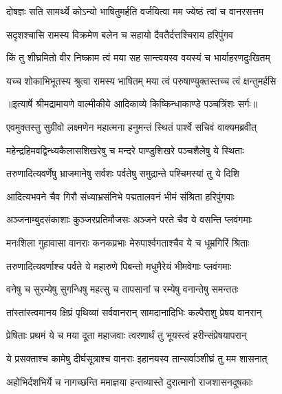 \twolineshloka
{दोषज्ञः सति सामर्थ्ये कोऽन्यो भाषितुमर्हति}
{वर्जयित्वा मम ज्येष्ठं त्वां च वानरसत्तम} %

\twolineshloka
{सदृशश्चासि रामस्य विक्रमेण बलेन च}
{सहायो दैवतैर्दत्तश्चिराय हरिपुंगव} %

\twolineshloka
{किं तु शीघ्रमितो वीर निष्क्राम त्वं मया सह}
{सान्त्वयस्व वयस्यं च भार्याहरणदुःखितम्} %

\twolineshloka
{यच्च शोकाभिभूतस्य श्रुत्वा रामस्य भाषितम्}
{मया त्वं परुषाण्युक्तस्तच्च त्वं क्षन्तुमर्हसि} %


{॥इत्यार्षे श्रीमद्रामायणे वाल्मीकीये आदिकाव्ये किष्किन्धाकाण्डे पञ्चत्रिंशः सर्गः॥}


\twolineshloka
{एवमुक्तस्तु सुग्रीवो लक्ष्मणेन महात्मना}
{हनुमन्तं स्थितं पार्श्वे सचिवं वाक्यमब्रवीत्} %

\twolineshloka
{महेन्द्रहिमवद्विन्ध्यकैलासशिखरेषु च}
{मन्दरे पाण्डुशिखरे पञ्चशैलेषु ये स्थिताः} %

\twolineshloka
{तरुणादित्यवर्णेषु भ्राजमानेषु सर्वशः}
{पर्वतेषु समुद्रान्ते पश्चिमस्यां तु ये दिशि} %

\twolineshloka
{आदित्यभवने चैव गिरौ संध्याभ्रसंनिभे}
{पद्मतालवनं भीमं संश्रिता हरिपुंगवाः} %

\twolineshloka
{अञ्जनाम्बुदसंकाशाः कुञ्जरप्रतिमौजसः}
{अञ्जने परते चैव ये वसन्ति प्लवंगमाः} %

\twolineshloka
{मनःशिला गुहावासा वानराः कनकप्रभाः}
{मेरुपार्श्वगताश्चैव ये च धूम्रगिरिं श्रिताः} %

\twolineshloka
{तरुणादित्यवर्णाश्च पर्वते ये महारुणे}
{पिबन्तो मधुमैरेयं भीमवेगाः प्लवंगमाः} %

\twolineshloka
{वनेषु च सुरम्येषु सुगन्धिषु महत्सु च}
{तापसानां च रम्येषु वनान्तेषु समन्ततः} %

\twolineshloka
{तांस्तांस्त्वमानय क्षिप्रं पृथिव्यां सर्ववानरान्}
{सामदानादिभिः कल्पैराशु प्रेषय वानरान्} %

\twolineshloka
{प्रेषिताः प्रथमं ये च मया दूता महाजवाः}
{त्वरणार्थं तु भूयस्त्वं हरीन्संप्रेषयापरान्} %

\twolineshloka
{ये प्रसक्ताश्च कामेषु दीर्घसूत्राश्च वानराः}
{इहानयस्व तान्सर्वाञ्शीघ्रं तु मम शासनात्} %

\twolineshloka
{अहोभिर्दशभिर्ये च नागच्छन्ति ममाज्ञया}
{हन्तव्यास्ते दुरात्मानो राजशासनदूषकाः} %

